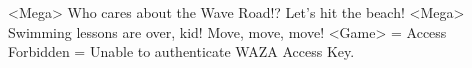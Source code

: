 <Mega> Who cares about the Wave Road!? Let's hit the beach! 
<Mega> Swimming lessons are over, kid! Move, move, move! 
<Game> = Access Forbidden = Unable to authenticate WAZA Access Key. 
